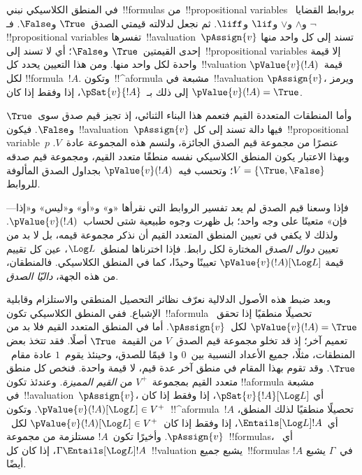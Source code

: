 \documentclass[../../../include/open-logic-section]{subfiles}
\begin{document}


في المنطق الكلاسيكي نبني~!!{formula}s من~!!{propositional variable}s
بروابط القضايا~$\lnot$ و$\land$ و$\lor$ و$\lif$ و$\liff$.
ثم نجعل لدلالته قيمتي الصدق~$\True$ و$\False$. فـ
  !!{propositional variable}s تفسرها~!!a{valuation}~$\pAssign{v}$
  تسند إلى كل واحد منها إحدى القيمتين~$\True$ و$\False$؛ أي لا تسند
  إلى~!!{propositional variable}s إلا قيمة واحدة لكل واحد منها. ومن هذا
التعيين يحدد كل~!!{valuation} قيمة~$\pValue{v}(!A)$ لكل
!!{formula}~$!A$. وتكون~!!^a{formula} مشبعة في~!!a{valuation}
$\pAssign{v}$، ويرمز إلى ذلك بـ~$\pSat{v}{!A}$، إذا وفقط إذا كان
$\pValue{v}(!A) = \True$.

وأما المنطقات المتعددة القيم فتعمم هذا البناء الثنائي، إذ تجيز قيم
صدق سوى~$\True$ و$\False$. فيكون~!!a{valuation}~$\pAssign{v}$ فيها
دالة تسند إلى كل~!!{propositional variable}~$p$ عنصرًا من مجموعة
قيم الصدق الجائزة، ولنسم هذه المجموعة عادة~$V$. وبهذا الاعتبار يكون
المنطق الكلاسيكي نفسه منطقًا متعدد القيم، ومجموعة قيم صدقه
$V = \{\True, \False\}$؛ وتحسب فيه~$\pValue{v}(!A)$ بجداول الصدق
المألوفة للروابط.


فإذا وسعنا قيم الصدق لم يعد تفسير الروابط التي نقرأها «و» و«أو»
و«ليس» و«إذا---فإن» متعينًا على وجه واحد؛ بل ظهرت وجوه طبيعية شتى
لحساب~$\pValue{v}(!A)$. ولذلك لا يكفي في تعيين المنطق المتعدد القيم
أن نذكر مجموعة قيمه، بل لا بد من تعيين \emph{دوال الصدق} المختارة
لكل رابط. فإذا اخترناها لمنطق~$\Log L$، عين كل تقييم قيمة
$\pValue{v}(!A)[\Log L]$ تعيينًا وحيدًا، كما في المنطق الكلاسيكي.
فالمنطقان، من هذه الجهة، \emph{داليّا الصدق}.

وبعد ضبط هذه الأصول الدلالية نعرّف نظائر التحصيل المنطقي والاستلزام
وقابلية الإشباع. ففي المنطق الكلاسيكي تكون~!!a{formula} تحصيلًا
منطقيًا إذا تحقق~$\pValue{v}(!A) = \True$ لكل~$\pAssign{v}$.
أما في المنطق المتعدد القيم فلا بد من تعميم آخر؛ إذ قد تخلو مجموعة
قيم الصدق~$V$ من القيمة~$\True$ أصلًا. فقد تتخذ بعض المنطقات، مثلًا، جميع الأعداد
النسبية بين~$0$ و$1$ قيمًا للصدق، وحينئذ يقوم~$1$ عادة مقام~$\True$.
وقد تقوم بهذا المقام في منطق آخر عدة قيم، لا قيمة واحدة. فنخص كل
منطق متعدد القيم بمجموعة~$V^+$ من \emph{القيم المميزة}. وعندئذ تكون
!!a{formula} مشبعة في~!!a{valuation}~$\pAssign{v}$، أي
$\pSat{v}{!A}[\Log L]$، إذا وفقط إذا كان
$\pValue{v}(!A)[\Log L] \in V^+$. وتكون~!!^a{formula}~$!A$
تحصيلًا منطقيًا لذلك المنطق، أي~$\Entails[\Log L] !A$، إذا وفقط إذا
كان~$\pValue{v}(!A)[\Log L] \in V^+$ لكل~$\pAssign{v}$. وأخيرًا تكون~$!A$
مستلزمة من مجموعة~!!{formula}s، أي~$\Gamma \Entails[\Log L] !A$،
إذا كان كل~!!{valuation} يشبع جميع~!!{formula}s في~$\Gamma$ يشبع
$!A$ أيضًا.
\end{document}
